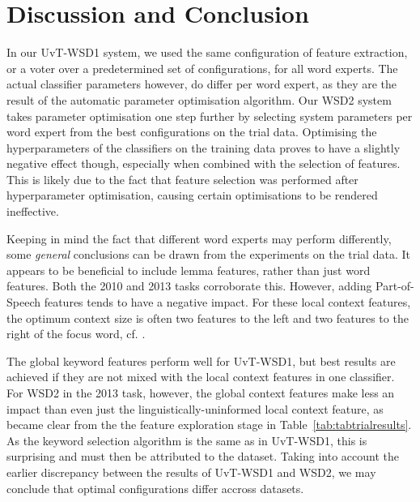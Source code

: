 \section{Discussion and Conclusion}




In our UvT-WSD1 system, we used the same configuration of feature extraction,
or a voter over a predetermined set of configurations, for all word experts. The actual
classifier parameters however, do differ per word expert, as they are the
result of the automatic parameter optimisation algorithm. Our WSD2 system
takes parameter optimisation one step further by selecting system parameters
per word expert from the best configurations on the trial data. Optimising the
hyperparameters of the classifiers on the training data proves to have a
slightly negative effect though, especially when combined with the selection of
features. This is likely due to the fact that feature selection was performed
after hyperparameter optimisation, causing certain optimisations to be rendered
ineffective.

Keeping in mind the fact that different word experts may perform differently,
some \emph{general} conclusions can be drawn from the experiments on the trial
data. It appears to be beneficial to include lemma features, rather than just
word features. Both the 2010 and 2013 tasks corroborate this. However, adding
Part-of-Speech features tends to have a negative impact. For these local
context features, the optimum context size is often two features to the left
and two features to the right of the focus word, cf.  \citep{Hendrickx+02}.

The global keyword features perform well for UvT-WSD1, but best results are
achieved if they are not mixed with the local context features in one
classifier. For WSD2 in the 2013 task, however, the global context features
make less an impact than even just the linguistically-uninformed local context
feature, as became clear from the the feature exploration stage in
Table~\ref{tab:tabtrialresults}. As the keyword selection algorithm is the same
as in UvT-WSD1, this is surprising and must then be attributed to the dataset.
Taking into account the earlier discrepancy between the results of UvT-WSD1 and
WSD2, we may conclude that optimal configurations differ accross datasets.

